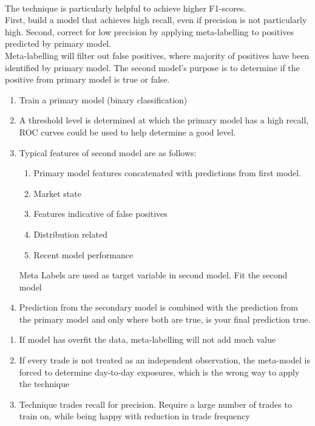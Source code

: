 \documentclass[a4paper,oneside,openany]{book}
\begin{document}
\begin{method} \\
The technique is particularly helpful to achieve higher F1-scores.\\
First, build a model that achieves high recall, even if precision is not particularly high. Second, correct for low precision by applying meta-labelling to positives predicted by primary model.\\
Meta-labelling will filter out false positives, where majority of positives have been identified by primary model. The second model's purpose is to determine if the positive from primary model is true or false.
\begin{enumerate}[label=\roman*.]
\setlength{\itemsep}{0pt}
\item Train a primary model (binary classification)
\item A threshold level is determined at which the primary model has a high recall, ROC curves could be used to help determine a good level.
\item Typical features of second model are as follows:
\begin{enumerate}[label=\roman*.]
\setlength{\itemsep}{0pt}
\item Primary model features concatenated with predictions from first model.
\item Market state
\item Features indicative of false positives
\item Distribution related
\item Recent model performance
\end{enumerate}
Meta Labels are used as target variable in second model. Fit the second model
\item Prediction from the secondary model is combined with the prediction from the primary model and only where both are true, is your final prediction true.
\end{enumerate}
\end{method}

\begin{remark} 
\begin{enumerate}[label=\roman*.]
\setlength{\itemsep}{0pt}
\item If model has overfit the data, meta-labelling will not add much value
\item If every trade is not treated as an independent observation, the meta-model is forced to determine day-to-day exposures, which is the wrong way to apply the technique
\item Technique trades recall for precision. Require a large number of trades to train on, while being happy with reduction in trade frequency
\end{enumerate}
\end{remark}
\end{document}
